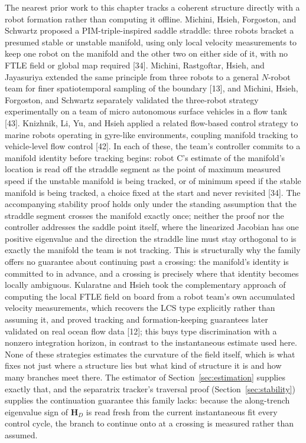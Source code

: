 \documentclass[12pt, letterpaper, oneside]{report}
\begin{document}
The nearest prior work to this chapter tracks a coherent structure directly
with a robot formation rather than computing it offline. Michini, Hsieh,
Forgoston, and Schwartz proposed a PIM-triple-inspired saddle straddle:
three robots bracket a presumed stable or unstable manifold, using only
local velocity measurements to keep one robot on the manifold and the other
two on either side of it, with no FTLE field or global map required [34].
Michini, Rastgoftar, Hsieh, and Jayasuriya extended the same principle from
three robots to a general $N$-robot team for finer spatiotemporal sampling
of the boundary [13], and Michini, Hsieh, Forgoston, and Schwartz
separately validated the three-robot strategy experimentally on a team of
micro autonomous surface vehicles in a flow tank [43]. Knizhnik, Li, Yu,
and Hsieh applied a related flow-based control strategy to marine robots
operating in gyre-like environments, coupling manifold tracking to
vehicle-level flow control [42]. In each of these, the team's controller
commits to a manifold identity before tracking begins: robot C's estimate
of the manifold's location is read off the straddle segment as the point of
maximum measured speed if the unstable manifold is being tracked, or of
minimum speed if the stable manifold is being tracked, a choice fixed at
the start and never revisited [34]. The accompanying stability proof holds
only under the standing assumption that the straddle segment crosses the
manifold exactly once; neither the proof nor the controller addresses the
saddle point itself, where the linearized Jacobian has one positive
eigenvalue and the direction the straddle line must stay orthogonal to is
exactly the manifold the team is not tracking. This is structurally why the
family offers no guarantee about continuing past a crossing: the
manifold's identity is committed to in advance, and a crossing is precisely
where that identity becomes locally ambiguous. Kularatne and Hsieh took the
complementary approach of computing the local FTLE field on board from a
robot team's own accumulated velocity measurements, which recovers the LCS
type explicitly rather than assuming it, and proved tracking and
formation-keeping guarantees later validated on real ocean flow data [12];
this buys type discrimination with a nonzero integration horizon, in
contrast to the instantaneous estimate used here. None of these strategies
estimates the curvature of the field itself, which is what fixes not just
where a structure lies but what kind of structure it is and how many
branches meet there. The estimator of Section~\ref{sec:estimation} supplies
exactly that, and the separatrix tracker's traversal proof
(Section~\ref{sec:stability}) supplies the continuation guarantee this
family lacks: because the along-trench eigenvalue sign of $\mathbf{H}_D$ is
read fresh from the current instantaneous fit every control cycle, the
branch to continue onto at a crossing is measured rather than assumed.
\end{document}

